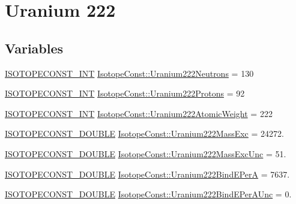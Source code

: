 \hypertarget{group___isotope_const-_uranium-_u222}{}\section{Uranium 222}
\label{group___isotope_const-_uranium-_u222}
\subsection*{Variables}
\begin{DoxyCompactItemize}
\item 
\mbox{\hyperlink{group___isotope_const-_macros_ga5f18360b3e99483a35c32d789e62621c}{I\+S\+O\+T\+O\+P\+E\+C\+O\+N\+S\+T\+\_\+\+I\+NT}} \mbox{\hyperlink{group___isotope_const-_uranium-_u222_ga81eafd97c372be0141beed1d60cd477a}{Isotope\+Const\+::\+Uranium222\+Neutrons}} = 130
\item 
\mbox{\hyperlink{group___isotope_const-_macros_ga5f18360b3e99483a35c32d789e62621c}{I\+S\+O\+T\+O\+P\+E\+C\+O\+N\+S\+T\+\_\+\+I\+NT}} \mbox{\hyperlink{group___isotope_const-_uranium-_u222_ga0096975d09814f8ec4f97374652c1969}{Isotope\+Const\+::\+Uranium222\+Protons}} = 92
\item 
\mbox{\hyperlink{group___isotope_const-_macros_ga5f18360b3e99483a35c32d789e62621c}{I\+S\+O\+T\+O\+P\+E\+C\+O\+N\+S\+T\+\_\+\+I\+NT}} \mbox{\hyperlink{group___isotope_const-_uranium-_u222_ga8c89bea275e2805181a21c9d63471adb}{Isotope\+Const\+::\+Uranium222\+Atomic\+Weight}} = 222
\item 
\mbox{\hyperlink{group___isotope_const-_macros_ga8f45a7272ce02c0b4c65c44636ed719a}{I\+S\+O\+T\+O\+P\+E\+C\+O\+N\+S\+T\+\_\+\+D\+O\+U\+B\+LE}} \mbox{\hyperlink{group___isotope_const-_uranium-_u222_gaf81083d8c19f625e2eb8d897b7654de5}{Isotope\+Const\+::\+Uranium222\+Mass\+Exc}} = 24272.
\item 
\mbox{\hyperlink{group___isotope_const-_macros_ga8f45a7272ce02c0b4c65c44636ed719a}{I\+S\+O\+T\+O\+P\+E\+C\+O\+N\+S\+T\+\_\+\+D\+O\+U\+B\+LE}} \mbox{\hyperlink{group___isotope_const-_uranium-_u222_gab7d09cd6c113d87bc8e39cad11c0cf0a}{Isotope\+Const\+::\+Uranium222\+Mass\+Exc\+Unc}} = 51.
\item 
\mbox{\hyperlink{group___isotope_const-_macros_ga8f45a7272ce02c0b4c65c44636ed719a}{I\+S\+O\+T\+O\+P\+E\+C\+O\+N\+S\+T\+\_\+\+D\+O\+U\+B\+LE}} \mbox{\hyperlink{group___isotope_const-_uranium-_u222_ga4c5034f4bf41be8f4c7a6764bd20d86e}{Isotope\+Const\+::\+Uranium222\+Bind\+E\+PerA}} = 7637.
\item 
\mbox{\hyperlink{group___isotope_const-_macros_ga8f45a7272ce02c0b4c65c44636ed719a}{I\+S\+O\+T\+O\+P\+E\+C\+O\+N\+S\+T\+\_\+\+D\+O\+U\+B\+LE}} \mbox{\hyperlink{group___isotope_const-_uranium-_u222_ga22b1720a0b1baabd212ef322927b189b}{Isotope\+Const\+::\+Uranium222\+Bind\+E\+Per\+A\+Unc}} = 0.

\end{DoxyCompactItemize}
